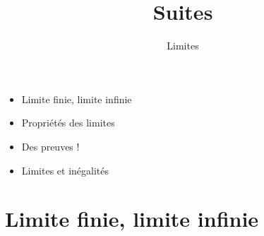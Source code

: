 








\title{{\bf Suites}}
\subtitle{Limites}


\begin{frame}
 \setcounter{framenumber}{0}
 
  \debutmontitre

  \pause

{\footnotesize
\hfill
{}
\begin{minipage}{0.6\textwidth}
  \begin{itemize}
    \item<3-> Limite finie, limite infinie
    \item<4-> Propriétés des limites
    \item<5-> Des preuves !
    \item<6-> Limites et inégalités
  \end{itemize}
\end{minipage}
}
\vspace*{1cm}
\end{frame}
% 
% 
% 
% 
% 
% 
% 
%   
% 
% 
%  


\section{Limite finie, limite infinie}

